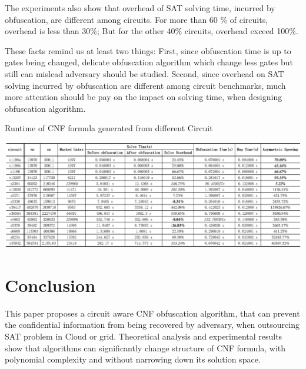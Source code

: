 \documentclass[conference,compsocconf]{IEEEtran}
\begin{document}
The experiments also show that overhead of SAT solving time, incurred by obfuscation, 
are different among circuits.
For more than 60 \% of circuits, overhead is less than 30\%; But for the other 40\% circuits, overhead exceed 100\%.

These facts remind us at least two things: 
First, since  obfuscation time is up to gates being changed, 
delicate obfuscation algorithm which change less gates but still can mislead adversary should be studied.
Second, since overhead on SAT solving incurred by obfuscation are different among circuit benchmarks, 
much more attention should be pay on the impact on solving time,  when designing obfuscation algorithm. 

\begin{table}
\caption{Runtime of CNF formula generated from different Circuit}
\centering
\includegraphics[width=18.2cm]{Experiment}
\label{fig_exp}
\end{table}

\section{Conclusion}
This paper proposes a circuit aware  CNF obfuscation algorithm, 
that can prevent the confidential information from being recovered by adversary, 
when outsourcing SAT problem in Cloud or grid.
Theoretical analysis and experimental results show that algorithms can significantly change structure of CNF formula, 
with polynomial complexity and without narrowing down its solution space.
\end{document}

